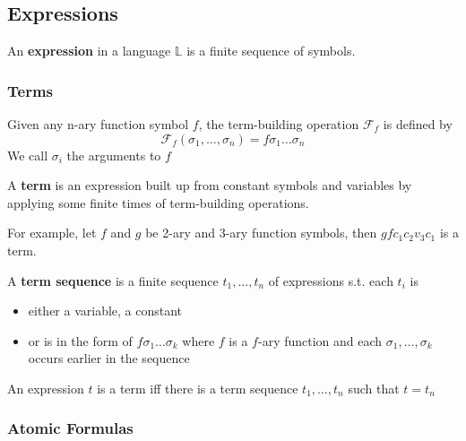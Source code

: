 \subsection{Expressions}

An \textbf{expression} in a language $\mathbb{L}$ is a finite sequence of symbols.

\subsubsection{Terms}

\begin{definition}
    \label{def:TermBuildingOperation}
    Given any n-ary function symbol $f$, the term-building operation $\mathcal{F}_f$ is defined by
    \[ \mathcal{F}_f (\sigma_1,\dots,\sigma_n) = f \sigma_1\dots\sigma_n \]
    We call $\sigma_i$ the arguments to $f$
\end{definition}

\begin{definition}[Term]
    \label{def:Term}
    A \textbf{term} is an expression built up from constant symbols and variables by applying some finite times of term-building operations.
    
\end{definition}

For example, let $f$ and $g$ be 2-ary and 3-ary function symbols, then $gfc_1c_2v_3c_1$ is a term.

\begin{definition}
    \label{def:TermSequence}
    A \textbf{term sequence} is a finite sequence $t_1,\dots,t_n$ of expressions s.t. each $t_i$ is
    \begin{itemize}
        \item either a variable, a constant
        \item or is in the form of $f\sigma_1\dots\sigma_k$ where $f$ is a $f$-ary function and each $\sigma_1,\dots,\sigma_k$ occurs earlier in the sequence
    \end{itemize}
\end{definition}

\begin{proposition}
    An expression $t$ is a term iff there is a term sequence $t_1,\dots,t_n$ such that $t=t_n$
\end{proposition}

\subsubsection{Atomic Formulas}

